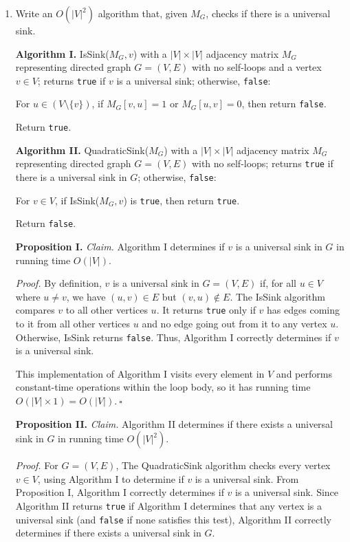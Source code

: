 \begin{enumerate}
\item Write an $O(|V|^2)$ algorithm that, given $M_G$, checks if there is a universal sink.
\begin{solution}

\textbf{Algorithm I. }{\sc IsSink}($M_G,v$) with a $|V|\times|V|$ adjacency matrix $M_G$ representing directed graph $G=(V,E)$ with no self-loops and a vertex $v\in V$; returns \verb|true| if $v$ is a universal sink; otherwise, \verb|false|:

For $u\in(V\setminus\{v\})$, if $M_G[v,u]=1$ or $M_G[u,v]=0$, then return \verb|false|.

Return \verb|true|.

\textbf{Algorithm II. }{\sc QuadraticSink}($M_G$) with a $|V|\times|V|$ adjacency matrix $M_G$ representing directed graph $G=(V,E)$ with no self-loops; returns \verb|true| if there is a universal sink in $G$; otherwise, \verb|false|:

For $v\in V$, if {\sc IsSink}($M_G,v$) is \verb|true|, then return \verb|true|.

Return \verb|false|.

\textbf{Proposition I. }\textit{Claim. }Algorithm I determines if $v$ is a universal sink in $G$ in running time $O(|V|)$.

\textit{Proof. }By definition, $v$ is a universal sink in $G=(V,E)$ if, for all $u\in V$ where $u\neq v$, we have $(u,v)\in E$ but $(v,u)\notin E$. The {\sc IsSink} algorithm compares $v$ to all other vertices $u$. It returns \verb|true| only if $v$ has edges coming to it from all other vertices $u$ and no edge going out from it to any vertex $u$. Otherwise, {\sc IsSink} returns \verb|false|. Thus, Algorithm I correctly determines if $v$ is a universal sink.

This implementation of Algorithm I visits every element in $V$ and performs constant-time operations within the loop body, so it has running time $O(|V|\times 1)=O(|V|).~\square$

\textbf{Proposition II. }\textit{Claim. }Algorithm II determines if there exists a universal sink in $G$ in running time $O(|V|^2)$.

\textit{Proof. }For $G=(V,E)$, The {\sc QuadraticSink} algorithm checks every vertex $v\in V$, using Algorithm I to determine if $v$ is a universal sink. From Proposition I, Algorithm I correctly determines if $v$ is a universal sink. Since Algorithm II returns \verb|true| if Algorithm I determines that any vertex is a universal sink (and \verb|false| if none satisfies this test), Algorithm II correctly determines if there exists a universal sink in $G$.


\end{solution}
\end{enumerate}

